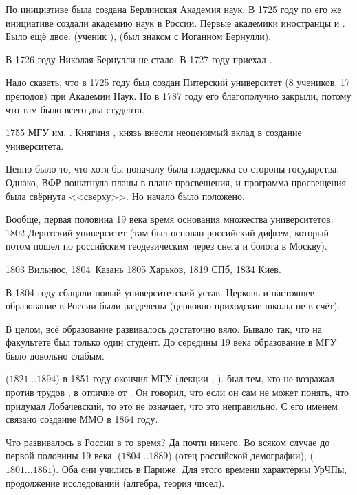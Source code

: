 \documentclass[a4paper,oneside,fleqn,10pt]{article}
\newcommand{\pe}[2]{${#1}\ldots{#2}$}
\begin{document}
По инициативе  была создана Берлинская
Академия наук.  В 1725 году по его же инициативе создали академию наук
в России.  Первые академики иностранцы  и .  Было ещё
двое:  (ученик ),
 (был знаком с Иоганном
Бернулли).

В 1726 году Николая Бернулли не стало. В 1727 году приехал
.

Надо сказать, что в 1725 году был создан Питерский университет (8
учеников, 17 преподов) при Академии Наук. Но в 1787 году его
благополучно закрыли, потому что там было всего два студента.

1755 МГУ им. . Княгиня ,
князь  внесли неоценимый вклад в создание университета.

Ценно было то, что хотя бы поначалу была поддержка со стороны
государства.  Однако, ВФР пошатнула планы 
в плане просвещения, и программа просвещения была свёрнута
<<сверху>>. Но начало было положено.

Вообще, первая половина 19 века время основания множества
университетов.  1802 Дерптский университет (там
 был основан российский дифгем, который
потом пошёл по российским геодезическим через снега и болота в
Москву).

1803 Вильнюс, 1804\ Казань 1805 Харьков, 1819 СПб, 1834 Киев.

В 1804 году сбацали новый университетский устав.  Церковь и настоящее
образование в России были разделены (церковно приходские школы не в
счёт).

В целом, всё образование развивалось достаточно вяло.  Бывало так, что
на факультете был только один студент.  До середины 19 века
образование в МГУ было довольно слабым.

 (\pe{1821}{1894}) в 1851 году окончил МГУ (лекции
, ).
 был тем, кто не возражал против трудов
, в отличие от
. Он говорил, что если он сам не
может понять, что придумал Лобачевский, то это не означает, что это
неправильно.  С его именем связано создание ММО в 1864 году.

Что развивалось в России в то время? Да почти ничего. Во всяком случае
до первой половины 19 века.   (\pe{1804}{1889}) (отец
российской демографии), 
(\pe{1801}{1861}). Оба они учились в Париже.  Для этого времени
характерны УрЧПы, продолжение исследований 
(алгебра, теория чисел).
\end{document}
